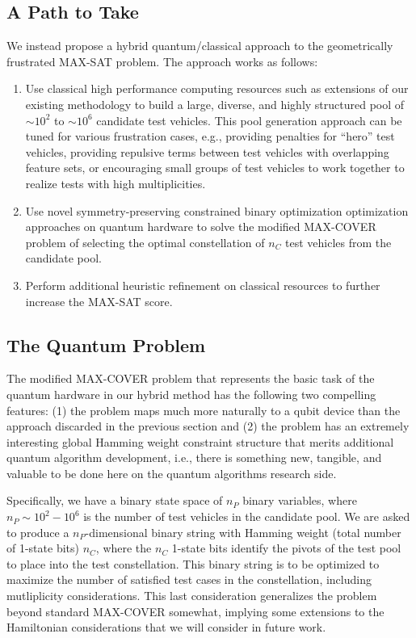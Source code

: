 \documentclass[aps,pra,twocolumn,superscriptaddress,groupedaddress]{revtex4}  %
\begin{document}
\subsection{A Path to Take}

We instead propose a hybrid quantum/classical approach to the geometrically frustrated MAX-SAT
problem. The approach works as follows:
\begin{enumerate}
\item Use classical high performance computing resources such as extensions of
our existing methodology to build a large, diverse, and highly structured pool
of $\sim 10^{2}$ to $\sim 10^{6}$ candidate test vehicles. This pool generation approach
can be tuned for various frustration cases, e.g., providing penalties for
``hero'' test vehicles, providing repulsive terms between test vehicles with overlapping
feature sets, or encouraging small groups of test vehicles to work together to
realize tests with high multiplicities.
\item Use novel symmetry-preserving constrained binary optimization optimization
approaches on quantum hardware to solve the modified MAX-COVER problem of
selecting the optimal constellation of $n_{C}$ test vehicles from the candidate
pool. 
\item Perform additional heuristic refinement on classical resources to further
increase the MAX-SAT score.
\end{enumerate}

\subsection{The Quantum Problem}

The modified MAX-COVER problem that represents the basic task of the quantum
hardware in our hybrid method has the following two compelling features: (1) the
problem maps much more naturally to a qubit device than the approach discarded
in the previous section and (2) the problem has an extremely interesting global
Hamming weight constraint structure that merits additional quantum algorithm
development, i.e., there is something new, tangible, and valuable to be done
here on the quantum algorithms research side. 

Specifically, we have a binary state space of $n_{P}$ binary variables, where
$n_{P} \sim 10^{2} - 10^{6}$ is the number of test vehicles in the candidate
pool. We are asked to produce a $n_{P}$-dimensional binary string with Hamming
weight (total number of 1-state bits) $n_{C}$, where the $n_{C}$ 1-state bits
identify the pivots of the test pool to place into the test constellation. This
binary string is to be optimized to maximize the number of satisfied test cases
in the constellation, including mutliplicity considerations. This last
consideration generalizes the problem beyond standard MAX-COVER somewhat,
implying some extensions to the Hamiltonian considerations that we will consider
in future work. 
\end{document}
